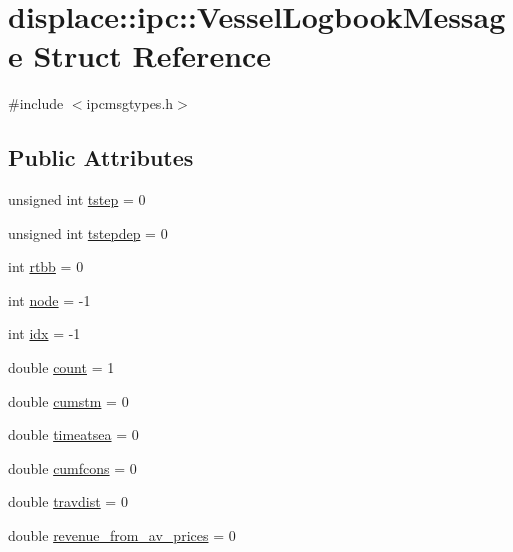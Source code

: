\hypertarget{structdisplace_1_1ipc_1_1_vessel_logbook_message}{}\section{displace\+::ipc\+::Vessel\+Logbook\+Message Struct Reference}
\label{structdisplace_1_1ipc_1_1_vessel_logbook_message}


{\ttfamily \#include $<$ipcmsgtypes.\+h$>$}

\subsection*{Public Attributes}
\begin{DoxyCompactItemize}
\item 
unsigned int \mbox{\hyperlink{structdisplace_1_1ipc_1_1_vessel_logbook_message_a3dad462468e271ea9bdb09b7102c642e}{tstep}} = 0
\item 
unsigned int \mbox{\hyperlink{structdisplace_1_1ipc_1_1_vessel_logbook_message_a08f19792a1c400f1bcf6f2d17636dcd4}{tstepdep}} = 0
\item 
int \mbox{\hyperlink{structdisplace_1_1ipc_1_1_vessel_logbook_message_a5e85b5f33e85a8a9e1e0f7ea0742d554}{rtbb}} = 0
\item 
int \mbox{\hyperlink{structdisplace_1_1ipc_1_1_vessel_logbook_message_a56e279185bb44eed09bfcd3c9a4ca2ad}{node}} = -\/1
\item 
int \mbox{\hyperlink{structdisplace_1_1ipc_1_1_vessel_logbook_message_ab939fd4f839e79ceb86d92406444430f}{idx}} = -\/1
\item 
double \mbox{\hyperlink{structdisplace_1_1ipc_1_1_vessel_logbook_message_a32eb853ab129ba1fdc7244348b3f68a3}{count}} = 1
\item 
double \mbox{\hyperlink{structdisplace_1_1ipc_1_1_vessel_logbook_message_ae331a836f2ad1305742e54a59ad20333}{cumstm}} = 0
\item 
double \mbox{\hyperlink{structdisplace_1_1ipc_1_1_vessel_logbook_message_af862d98e5e529f2181eb17fc96179799}{timeatsea}} = 0
\item 
double \mbox{\hyperlink{structdisplace_1_1ipc_1_1_vessel_logbook_message_aaf6a62872ee94fe5181ce96dc157dd18}{cumfcons}} = 0
\item 
double \mbox{\hyperlink{structdisplace_1_1ipc_1_1_vessel_logbook_message_a90cef4f396b2da563df48050888da056}{travdist}} = 0
\item 
double \mbox{\hyperlink{structdisplace_1_1ipc_1_1_vessel_logbook_message_a22f794b0fe4527de4623b8c8727776ef}{revenue\+\_\+from\+\_\+av\+\_\+prices}} = 0

\end{DoxyCompactItemize}
